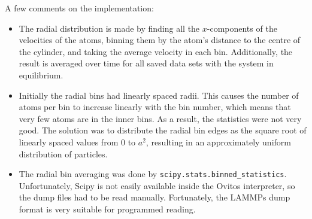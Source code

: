 \documentclass[11pt,british,a4paper]{report}
\begin{document}
A few comments on the implementation:
\begin{itemize}
    \item The radial distribution is made by finding all the \(x\)-components of the velocities of the atoms, binning them by the atom's distance to the centre of the cylinder, and taking the average velocity in each bin. Additionally, the result is averaged over time for all saved data sets with the system in equilibrium.
    \item Initially the radial bins had linearly spaced radii. This causes the number of atoms per bin to increase linearly with the bin number, which means that very few atoms are in the inner bins. As a result, the statistics were not very good. The solution was to distribute the radial bin edges as the square root of linearly spaced values from \(0\) to \(a^2\), resulting in an approximately uniform distribution of particles.
    \item The radial bin averaging was done by \texttt{scipy.stats.binned\_statistics}. Unfortunately, Scipy is not easily available inside the Ovitos interpreter, so the dump files had to be read manually. Fortunately, the LAMMPs dump format is very suitable for programmed reading.
\end{itemize}





































\nocite{*}
\printbibliography{}
\end{document}
